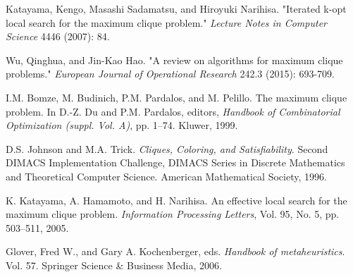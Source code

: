 \documentclass{article}
\begin{document}
\begin{thebibliography}{58}

  Katayama, Kengo, Masashi Sadamatsu, and Hiroyuki Narihisa. 
"Iterated k-opt local search for the maximum clique problem." 
\textit{Lecture Notes in Computer Science} 4446 (2007): 84.

Wu, Qinghua, and Jin-Kao Hao. 
"A review on algorithms for maximum clique problems." 
\textit{European Journal of Operational Research} 242.3 (2015): 693-709.

I.M. Bomze, M. Budinich, P.M. Pardalos, and M. Pelillo. The maximum clique
problem. In D.-Z. Du and P.M. Pardalos, editors, \textit{Handbook of Combinatorial
Optimization (suppl. Vol. A)}, pp. 1–74. Kluwer, 1999.

D.S. Johnson and M.A. Trick. \textit{Cliques, Coloring, and Satisfiability}. Second DIMACS
Implementation Challenge, DIMACS Series in Discrete Mathematics and
Theoretical Computer Science. American Mathematical Society, 1996.

 K. Katayama, A. Hamamoto, and H. Narihisa. An effective local search for the
maximum clique problem. \textit{Information Processing Letters}, Vol. 95, No. 5, pp.
503–511, 2005.

Glover, Fred W., and Gary A. Kochenberger, eds. \textit{Handbook of metaheuristics}. Vol. 57. Springer Science \& Business Media, 2006.

\end{thebibliography}
\end{document}
